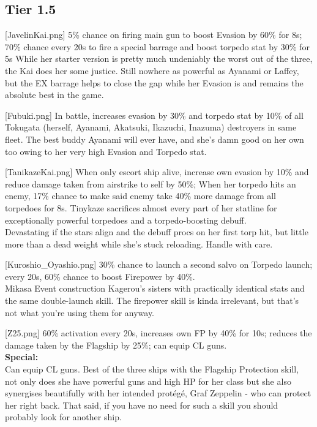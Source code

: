  
\newpage
\subsection{Tier 1.5}
[JavelinKai.png]
{5\% chance on firing main gun to boost Evasion by 60\% for 8s; 70\% chance every 20s to fire a special barrage and boost torpedo stat by 30\% for 5s}
{}
{While her starter version is pretty much undeniably the worst out of the three, the Kai does her some justice. Still nowhere as powerful as Ayanami or Laffey, but the EX barrage helps to close the gap while her Evasion is and remains the absolute best in the game.}
 
[Fubuki.png]
{In battle, increases evasion by 30\% and torpedo stat by 10\% of all Tokugata (herself, Ayanami, Akatsuki, Ikazuchi, Inazuma) destroyers in same fleet.}
{}
{The best buddy Ayanami will ever have, and she's damn good on her own too owing to her very high Evasion and Torpedo stat.}

[TanikazeKai.png]
{When only escort ship alive, increase own evasion by 10\% and reduce damage taken from airstrike to self by 50\%; When her torpedo hits an enemy, 17\% chance to make said enemy take 40\% more damage from all torpedoes for 8s.}
{}
{Tinykaze sacrifices almost every part of her statline for exceptionally powerful torpedoes and a torpedo-boosting debuff.\\
Devastating if the stars align and the debuff procs on her first torp hit, but little more than a dead weight while she's stuck reloading. Handle with care.}

[Kuroshio_Oyashio.png]
{30\% chance to launch a second salvo on Torpedo launch; every 20s, 60\% chance to boost Firepower by 40\%.\\
Mikasa Event construction}
{}
{Kagerou's sisters with practically identical stats and the same double-launch skill. The firepower skill is kinda irrelevant, but that's not what you're using them for anyway.}

[Z25.png]
{60\% activation every 20s, increases own FP by 40\% for 10s; reduces the damage taken by the Flagship by 25\%; can equip CL guns.\\
\textbf{Special:}\\ Can equip CL guns.}
{}
{Best of the three ships with the Flagship Protection skill, not only does she have powerful guns and high HP for her class but she also synergises beautifully with her intended protégé, Graf Zeppelin - who can protect her right back. That said, if you have no need for such a skill you should probably look for another ship.}

